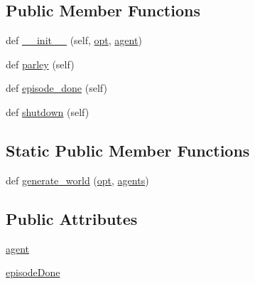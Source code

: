 \subsection*{Public Member Functions}
\begin{DoxyCompactItemize}
\item 
def \hyperlink{classparlai_1_1chat__service_1_1services_1_1messenger_1_1worlds_1_1OnboardWorld_a5d87a102fe7e53c097013693cb463586}{\+\_\+\+\_\+init\+\_\+\+\_\+} (self, \hyperlink{classparlai_1_1core_1_1worlds_1_1World_a3640d92718acd3e6942a28c1ab3678bd}{opt}, \hyperlink{classparlai_1_1chat__service_1_1services_1_1messenger_1_1worlds_1_1OnboardWorld_a405b255204e3a90021287dd6c6483a87}{agent})
\item 
def \hyperlink{classparlai_1_1chat__service_1_1services_1_1messenger_1_1worlds_1_1OnboardWorld_a664d819760279a7fc25ef6d207672d65}{parley} (self)
\item 
def \hyperlink{classparlai_1_1chat__service_1_1services_1_1messenger_1_1worlds_1_1OnboardWorld_a8cbe67b99d5d5db6e1b37f1bb04e3296}{episode\+\_\+done} (self)
\item 
def \hyperlink{classparlai_1_1chat__service_1_1services_1_1messenger_1_1worlds_1_1OnboardWorld_a9950fda8e861eba45d00b12b140f6401}{shutdown} (self)
\end{DoxyCompactItemize}
\subsection*{Static Public Member Functions}
\begin{DoxyCompactItemize}
\item 
def \hyperlink{classparlai_1_1chat__service_1_1services_1_1messenger_1_1worlds_1_1OnboardWorld_adbc47fed41044019aca88162e115a8e3}{generate\+\_\+world} (\hyperlink{classparlai_1_1core_1_1worlds_1_1World_a3640d92718acd3e6942a28c1ab3678bd}{opt}, \hyperlink{classparlai_1_1core_1_1worlds_1_1World_a728f75194cc26ea4035047c46cf62608}{agents})
\end{DoxyCompactItemize}
\subsection*{Public Attributes}
\begin{DoxyCompactItemize}
\item 
\hyperlink{classparlai_1_1chat__service_1_1services_1_1messenger_1_1worlds_1_1OnboardWorld_a405b255204e3a90021287dd6c6483a87}{agent}
\item 
\hyperlink{classparlai_1_1chat__service_1_1services_1_1messenger_1_1worlds_1_1OnboardWorld_ac6edc33667eb01803fb1eb88a769a0de}{episode\+Done}
\end{DoxyCompactItemize}


